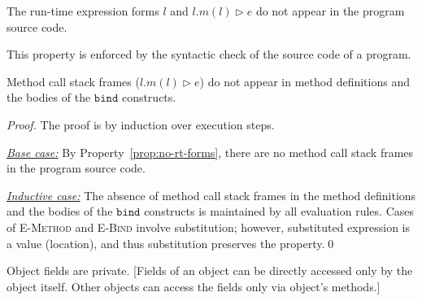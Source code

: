 \documentclass{llncs}
\newcommand{\keywadj}[1]{\mathtt{#1}}
\begin{document}

\begin{property}
\label{prop:no-rt-forms}
The run-time expression forms $l$ and $l.m(l) \rhd e$ do not appear in the program source code.
\end{property}

\noindent This property is enforced by the syntactic check of the source code of a program.

\vspace{10pt}

\begin{property}
\label{prop:mcsf-def-bind}
Method call stack frames ($l.m(l) \rhd e$) do not appear in method definitions and the bodies of the $\keywadj{bind}$ constructs.
\end{property}

\begin{proof}
The proof is by induction over execution steps.

\noindent\underline{\textit{Base case:}} By Property~\ref{prop:no-rt-forms}, there are no method call stack frames in the program source code.

\noindent\underline{\textit{Inductive case:}} The absence of method call stack frames in the method definitions and the bodies of the $\keywadj{bind}$ constructs is maintained by all evaluation rules. Cases of \textsc{E-Method} and \textsc{E-Bind} involve substitution; however, substituted expression is a value (location), and thus substitution preserves the property.\qed
\end{proof}

\vspace{10pt}

\begin{property}
\label{prop:fields-private}
Object fields are private. [Fields of an object can be directly accessed only by the object itself. Other objects can access the fields only via object's methods.]
\end{property}
\end{document}
